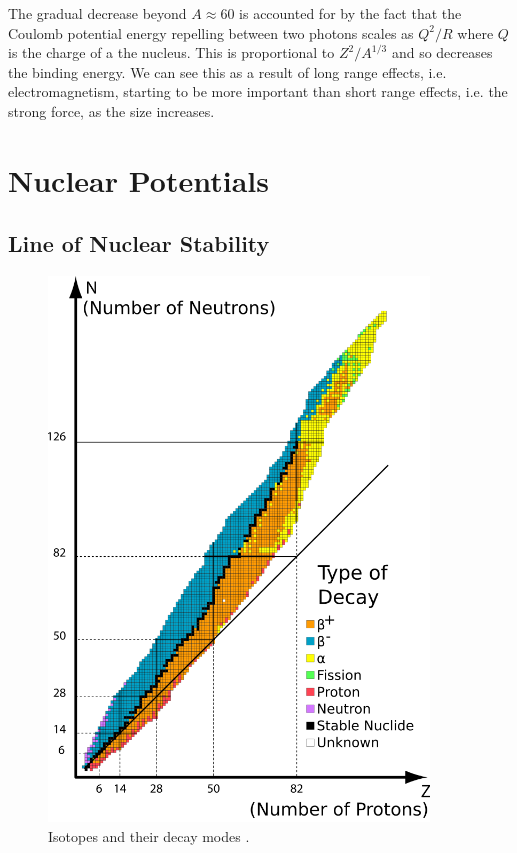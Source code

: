 \documentclass[fleqn]{NotesClass}
\begin{document}
    
    The gradual decrease beyond \(A \approx 60\) is accounted for by the fact that the Coulomb potential energy repelling between two photons scales as \(Q^2/R\) where \(Q\) is the charge of a the nucleus.
    This is proportional to \(Z^2/A^{1/3}\) and so decreases the binding energy.
    We can see this as a result of long range effects, i.e. electromagnetism, starting to be more important than short range effects, i.e. the strong force, as the size increases.
    
    \chapter{Nuclear Potentials}
    \section{Line of Nuclear Stability}
    \begin{figure}
        \includegraphics[width=0.9\textwidth]{images/line-nuclear-stability.png}
        \caption{Isotopes and their decay modes \cite{lineofnuclearstability}.}
        \label{fig:line of nuclear stability}
    \end{figure}
    
\end{document}
